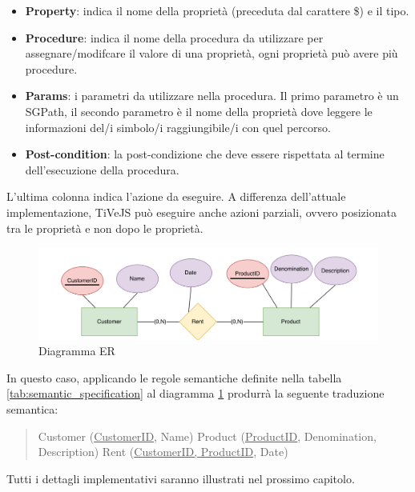         \begin{itemize}
            \item \textbf{Property}: indica il nome della proprietà (preceduta dal carattere \$) e il tipo.
            \item \textbf{Procedure}: indica il nome della procedura da utilizzare per assegnare/modifcare il valore di una proprietà, ogni proprietà può avere più procedure.
            \item \textbf{Params}: i parametri da utilizzare nella procedura. Il primo parametro è un SGPath, il secondo parametro è il nome della proprietà dove leggere le informazioni del/i simbolo/i raggiungibile/i con quel percorso.
            \item \textbf{Post-condition}: la post-condizione che deve essere rispettata al termine dell'esecuzione della procedura. 
        \end{itemize}
        L'ultima colonna indica l'azione da eseguire. A differenza dell'attuale implementazione, TiVeJS può eseguire anche azioni parziali, ovvero posizionata tra le proprietà e non dopo le proprietà.
        \newline
        \begin{figure}[htbp]
            \centering
            \includegraphics[scale=0.4]{Figure/er_diagram.PNG}
            \caption{Diagramma ER}
            \label{fig:er_diagram}
        \end{figure}
        In questo caso, applicando le regole semantiche definite nella tabella \ref{tab:semantic_specification} al diagramma \ref{fig:er_diagram} produrrà la seguente traduzione semantica:
        \begin{quotation}
            \noindent
            Customer (\underline{CustomerID}, Name) \newline
            Product (\underline{ProductID}, Denomination, Description) \newline
            Rent (\underline{CustomerID, ProductID}, Date)
        \end{quotation}
        Tutti i dettagli implementativi saranno illustrati nel prossimo capitolo.